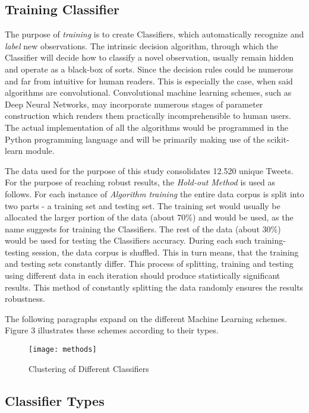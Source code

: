 	\subsection{Training Classifier}
	The purpose of \textit{training} is to create Classifiers, which automatically recognize and \textit{label} new observations. The intrinsic	decision algorithm, through which the Classifier will decide how to classify a novel observation, usually remain hidden and operate as a black-box of sorts. Since the decision rules could be numerous and far from intuitive for human readers. This is especially the case, when said algorithms are convolutional. Convolutional machine learning schemes, such as Deep Neural Networks, may incorporate numerous stages of parameter construction which renders them practically incomprehensible to human users. The actual implementation of all the algorithms would be programmed in the Python programming language and will be primarily making use of the scikit-learn\cite{scikit-learn} module.
	\par
	The data used for the purpose of this study consolidates 12.520 unique Tweets. For the purpose of reaching robust results, the \textit{Hold-out Method} is used as follows. For each instance of \textit{Algorithm training} the entire data corpus is split into two parts - a training set and testing set. The training set would usually be allocated the larger portion of the data (about 70\%) and would be used, as the name suggests for training the Classifiers. The rest of the data (about 30\%) would be used for testing the Classifiers accuracy. During each such training-testing session, the data corpus is shuffled. This in turn means, that the training and testing sets constantly differ. This process of splitting, training and testing using different data in each iteration should produce statistically significant results. This method of constantly splitting the data randomly ensures the results robustness.
	\par
	The following paragraphs expand on the different Machine Learning schemes. Figure 3 illustrates these schemes according to their types.
	
	\begin{figure}[h]
		
		\centering
		\texttt{[image: methods]}
		\caption{Clustering of Different Classifiers}
	\end{figure}

	\subsection{Classifier Types}
	

